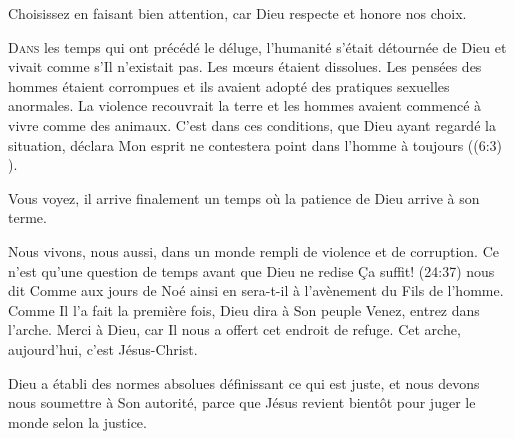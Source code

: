 Choisissez en faisant bien attention, car Dieu respecte et honore nos choix. 

\dvrule









\lettrine{D}{ans} les temps qui ont précédé le déluge, l'humanité s'était
 détournée de Dieu et vivait comme s'Il n'existait pas. Les m\oe{}urs étaient
 dissolues. Les pensées des hommes étaient corrompues et ils avaient adopté
 des pratiques sexuelles anormales. La violence recouvrait la terre et les
 hommes avaient commencé à vivre comme des animaux. C'est dans ces conditions,
 que Dieu ayant regardé la situation, déclara\frcolon{} \Og Mon esprit
 ne contestera point dans l'homme à toujours \Fg{} ((6:3) \Ostervald{}). 

Vous voyez, il arrive finalement un temps où la patience de Dieu arrive à son terme. 

Nous vivons, nous aussi, dans un monde rempli de violence et de corruption.
 Ce n'est qu'une question de temps avant que Dieu ne redise\frcolon{} \Og Ça suffit! \Fg{} 
 (24:37) nous dit\frcolon{} \Og Comme aux jours de Noé ainsi en sera-t-il
 à l'avènement du Fils de l'homme.\Fg{} Comme Il l'a fait la première fois, Dieu
 dira à Son peuple\frcolon{} \Og Venez, entrez dans l'arche. \Fg{} Merci à Dieu, car Il
 nous a offert cet endroit de refuge. Cet arche, aujourd'hui, c'est Jésus-Christ.



Dieu a établi des normes absolues définissant ce qui est juste, et nous devons
 nous soumettre à Son autorité, parce que Jésus revient bientôt pour juger le
 monde selon la justice.

